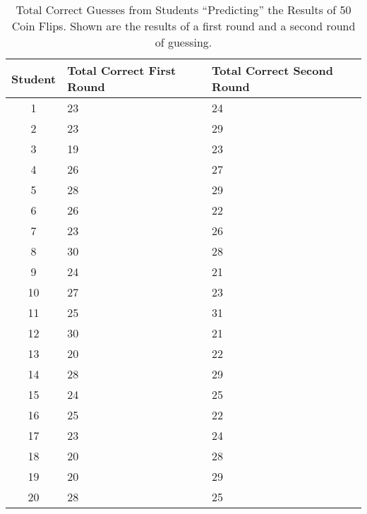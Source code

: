 \begin{table}
\begin{center}
\begin{tabular}{cp{.8in}p{.8in}}
\toprule
Student& Total Correct First Round& Total Correct Second Round\\
\midrule
1 & 23  & 24 \\
2 & 23  & 29 \\
3 & 19  & 23 \\
4 & 26  & 27 \\
5 & 28  & 29 \\
6 & 26  & 22 \\
7 & 23  & 26 \\
8 & 30  & 28 \\
9 & 24  & 21 \\
10 & 27  & 23 \\
11 & 25  & 31 \\
12 & 30  & 21 \\
13 & 20  & 22 \\
14 & 28  & 29 \\
15 & 24  & 25 \\
16 & 25  & 22 \\
17 & 23  & 24 \\
18 & 20  & 28 \\
19 & 20  & 29 \\
20 & 28  & 25 \\
\bottomrule
\end{tabular}
\end{center}
\caption{Total Correct Guesses from Students ``Predicting'' the Results of 50 Coin Flips.  Shown are the results of a first round and a second round of guessing.}
\label{tbl:coinguess}
\end{table}



